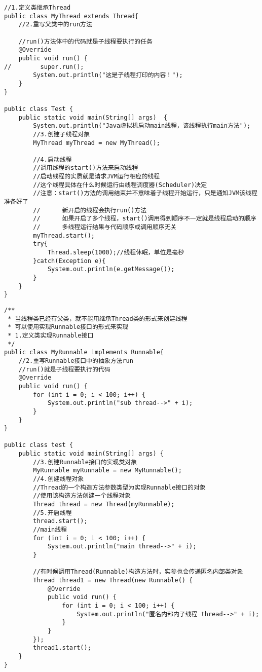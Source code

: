 \documentclass[a4paper]{report}
\begin{document}
\begin{lstlisting}[title=创建线程方式一]
//1.定义类继承Thread
public class MyThread extends Thread{
    //2.重写父类中的run方法

    //run()方法体中的代码就是子线程要执行的任务
    @Override
    public void run() {
//        super.run();
        System.out.println("这是子线程打印的内容！");
    }
}

public class Test {
    public static void main(String[] args)  {
        System.out.println("Java虚拟机启动main线程，该线程执行main方法");
        //3.创建子线程对象
        MyThread myThread = new MyThread();

        //4.启动线程
        //调用线程的start()方法来启动线程
        //启动线程的实质就是请求JVM运行相应的线程
        //这个线程具体在什么时候运行由线程调度器(Scheduler)决定
        //注意：start()方法的调用结束并不意味着子线程开始运行，只是通知JVM该线程准备好了
        //      新开启的线程会执行run()方法
        //      如果开启了多个线程，start()调用得到顺序不一定就是线程启动的顺序
        //      多线程运行结果与代码顺序或调用顺序无关
        myThread.start();
        try{
            Thread.sleep(1000);//线程休眠，单位是毫秒
        }catch(Exception e){
            System.out.println(e.getMessage());
        }
    }
}
\end{lstlisting}

\begin{lstlisting}[title=创建线程方式二]
/**
 * 当线程类已经有父类，就不能用继承Thread类的形式来创建线程
 * 可以使用实现Runnable接口的形式来实现
 * 1.定义类实现Runnable接口
 */
public class MyRunnable implements Runnable{
    //2.重写Runnable接口中的抽象方法run
    //run()就是子线程要执行的代码
    @Override
    public void run() {
        for (int i = 0; i < 100; i++) {
            System.out.println("sub thread-->" + i);
        }
    }
}

public class test {
    public static void main(String[] args) {
        //3.创建Runnable接口的实现类对象
        MyRunnable myRunnable = new MyRunnable();
        //4.创建线程对象
        //Thread的一个构造方法参数类型为实现Runnable接口的对象
        //使用该构造方法创建一个线程对象
        Thread thread = new Thread(myRunnable);
        //5.开启线程
        thread.start();
        //main线程
        for (int i = 0; i < 100; i++) {
            System.out.println("main thread-->" + i);
        }

        //有时候调用Thread(Runnable)构造方法时，实参也会传递匿名内部类对象
        Thread thread1 = new Thread(new Runnable() {
            @Override
            public void run() {
                for (int i = 0; i < 100; i++) {
                    System.out.println("匿名内部内子线程 thread-->" + i);
                }
            }
        });
        thread1.start();
    }
}
\end{lstlisting}
\end{document}
